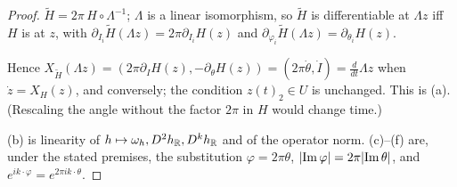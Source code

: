 \begin{proof}
\label{stepN:p1:pc-chain} $\tilde H=2\pi\,H\circ\Lambda^{-1}$; $\Lambda$ is a linear isomorphism, so $\tilde H$ is differentiable at $\Lambda z$ iff $H$ is at $z$, with $\partial_{I_i}\tilde H(\Lambda z)=2\pi\partial_{I_i}H(z)$ and $\partial_{\varphi_i}\tilde H(\Lambda z)=\partial_{\theta_i}H(z)$.

\label{stepN:p1:pc-field} Hence $X_{\tilde H}(\Lambda z)=(2\pi\partial_IH(z),-\partial_\theta H(z))=(2\pi\dot\theta,\dot I)=\frac d{dt}\Lambda z$ when $\dot z=X_H(z)$, and conversely; the condition $z(t)_2\in U$ is unchanged. This is (a). (Rescaling the angle without the factor $2\pi$ in $H$ would change time.)

\label{stepN:p1:pc-scalar} (b) is linearity of $h\mapsto\omega_h,D^2h_{\mathbb{R}},D^kh_{\mathbb{R}}$ and of the operator norm. (c)--(f) are, under the stated premises, the substitution $\varphi=2\pi\theta$, $\lvert \operatorname{Im}\varphi\rvert=2\pi\lvert \operatorname{Im}\theta\rvert$, and $e^{ik\cdot\varphi}=e^{2\pi ik\cdot\theta}$.
\end{proof}

